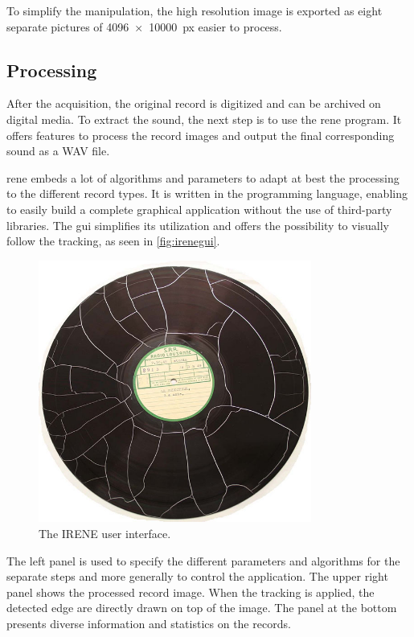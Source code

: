 To simplify the manipulation, the high resolution image is exported as eight separate pictures of \SI[product-units=single]{4096x10000}{px} easier to process.

\subsection{Processing}

After the acquisition, the original record is digitized and can be archived on digital media. To extract the sound, the next step is to use the \gls{rene} program. It offers features to process the record images and output the final corresponding sound as a WAV file.

\gls{rene} embeds a lot of algorithms and parameters to adapt at best the processing to the different record types. It is written in the \Csh{} programming language, enabling to easily build a complete graphical application without the use of third-party libraries. The \gls{gui} simplifies its utilization and offers the possibility to visually follow the tracking, as seen in \autoref{fig:irenegui}.

\begin{figure}[!ht]
\centering
\includegraphics[width=0.8\textwidth]{images/cracked-disc}
\caption{The IRENE user interface.}
\label{fig:irenegui}
\end{figure}

The left panel is used to specify the different parameters and algorithms for the separate steps and more generally to control the application. The upper right panel shows the processed record image. When the tracking is applied, the detected edge are directly drawn on top of the image. The panel at the bottom presents diverse information and statistics on the records.

